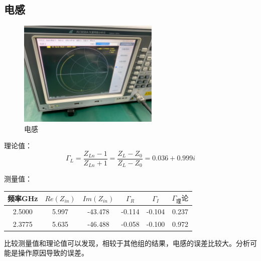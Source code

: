 \documentclass{../source/Experiment}
\begin{document}
\subsection{电感}
\begin{figure}[H]
    \centering
    \includegraphics[width = 0.6\textwidth]{pic/C2}
    \caption{电感}
\end{figure}
理论值：$$\Gamma _L = \frac{Z_{Ln}-1}{Z_{Ln}+1} = \frac{Z_L - Z_0}{Z_L - Z_0} = 0.036 +
    0.999i$$

测量值：
\begin{table}[H]
    \centering
    \begin{tabular}{|c|c|c|c|c|c|}
        \hline
        频率GHz & $Re(Z_{in})$ & $Im(Z_{in})$ & $\Gamma _R$ & $\Gamma _I$ & $\Gamma _理论$ \\ \hline
        2.5000  & 5.997        & -43.478      & -0.114      & -0.104      & 0.237          \\ \hline
        2.3775  & 5.635        & -46.488      & -0.058      & -0.100      & 0.972          \\ \hline
    \end{tabular}
\end{table}

比较测量值和理论值可以发现，相较于其他组的结果，电感的误差比较大。分析可能是操作原因导致的误差。
\end{document}

